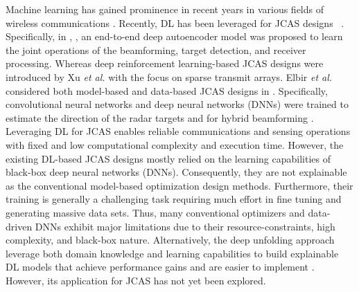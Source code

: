 \documentclass[conference]{IEEEtran}
\begin{document}

Machine learning has gained prominence in recent years in various fields of wireless communications \cite{8964474, 8642915, 9772315, 9047156, 9425589, 9626148}. Recently, DL has been leveraged for JCAS designs ~\cite{Mateos2022EndtoEnd,muth2023Autoencoder,xu2022deep,elbir2021terahertz}. Specifically, in \cite{Mateos2022EndtoEnd}, \cite{muth2023Autoencoder}, an end-to-end deep autoencoder model was proposed to learn the joint operations of the beamforming, target detection, and receiver processing. Whereas deep reinforcement learning-based JCAS designs were introduced by Xu \textit{et al.} \cite{xu2022deep} with the focus on sparse transmit arrays. Elbir {\it et al.} considered both model-based and data-based JCAS designs in \cite{elbir2021terahertz}. Specifically, convolutional neural networks and deep neural networks (DNNs) were trained to estimate the direction of the radar targets and for hybrid beamforming \cite{elbir2021terahertz}. Leveraging DL for JCAS enables reliable communications and sensing operations with fixed and low computational complexity and execution time. However, the existing DL-based JCAS designs mostly relied on the learning capabilities of black-box deep neural networks (DNNs). Consequently, they are not explainable as the conventional model-based optimization design methods. Furthermore, their training is generally a challenging task requiring much effort in fine tuning and generating massive data sets. Thus, many conventional optimizers and data-driven DNNs exhibit major limitations due to their resource-constraints, high complexity, and black-box nature. Alternatively, the deep unfolding approach leverage both domain knowledge and learning capabilities to build explainable DL models that achieve performance gains and are easier to implement \cite{9557819}. However, its application for JCAS has not yet been explored.
\end{document}
